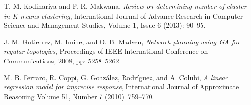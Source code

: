 \documentclass[conference,compsoc]{IEEEtran}
\begin{document}
\begin{thebibliography}{1}
T. M. Kodinariya and P. R. Makwana, \emph{Review on determining number of cluster in K-means clustering}, International Journal of Advance Research in
Computer Science and Management Studies, Volume 1, Issue 6 (2013): 90--95.


J. M. Gutierrez, M. Imine, and O. B. Madsen, \emph{Network planning using GA for regular topologies}, Proceedings of IEEE International Conference on Communications, 2008, pp: 5258--5262.


M. B. Ferraro, R. Coppi, G. Gonz\'alez, Rodr\'iguez, and A. Colubi, \emph{A linear regression model for imprecise response}, International Journal of Approximate Reasoning Volume 51, Number 7 (2010): 759--770.







\end{thebibliography}
 
 
 
 
\end{document}
